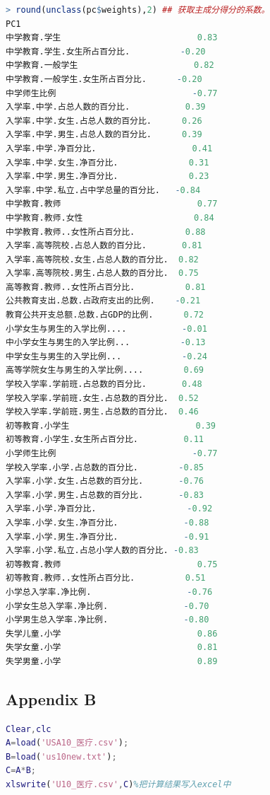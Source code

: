 \documentclass{apmcmthesis}
\begin{document}
\begin{lstlisting}[language=r]
> round(unclass(pc$weights),2) ## 获取主成分得分的系数。
PC1
中学教育.学生                           0.83
中学教育.学生.女生所占百分比.          -0.20
中学教育.一般学生                       0.82
中学教育.一般学生.女生所占百分比.      -0.20
中学师生比例                           -0.77
入学率.中学.占总人数的百分比.           0.39
入学率.中学.女生.占总人数的百分比.      0.26
入学率.中学.男生.占总人数的百分比.      0.39
入学率.中学.净百分比.                   0.41
入学率.中学.女生.净百分比.              0.31
入学率.中学.男生.净百分比.              0.23
入学率.中学.私立.占中学总量的百分比.   -0.84
中学教育.教师                           0.77
中学教育.教师.女性                      0.84
中学教育.教师..女性所占百分比.          0.88
入学率.高等院校.占总人数的百分比.       0.81
入学率.高等院校.女生.占总人数的百分比.  0.82
入学率.高等院校.男生.占总人数的百分比.  0.75
高等教育.教师..女性所占百分比.          0.81
公共教育支出.总数.占政府支出的比例.    -0.21
教育公共开支总额.总数.占GDP的比例.      0.72
小学女生与男生的入学比例....           -0.01
中小学女生与男生的入学比例...          -0.13
中学女生与男生的入学比例...            -0.24
高等学院女生与男生的入学比例....        0.69
学校入学率.学前班.占总数的百分比.       0.48
学校入学率.学前班.女生.占总数的百分比.  0.52
学校入学率.学前班.男生.占总数的百分比.  0.46
初等教育.小学生                         0.39
初等教育.小学生.女生所占百分比.         0.11
小学师生比例                           -0.77
学校入学率.小学.占总数的百分比.        -0.85
入学率.小学.女生.占总数的百分比.       -0.76
入学率.小学.男生.占总数的百分比.       -0.83
入学率.小学.净百分比.                  -0.92
入学率.小学.女生.净百分比.             -0.88
入学率.小学.男生.净百分比.             -0.91
入学率.小学.私立.占总小学人数的百分比. -0.83
初等教育.教师                           0.75
初等教育.教师..女性所占百分比.          0.51
小学总入学率.净比例.                   -0.76
小学女生总入学率.净比例.               -0.70
小学男生总入学率.净比例.               -0.80
失学儿童.小学                           0.86
失学女童.小学                           0.81
失学男童.小学                           0.89

 \end{lstlisting}
\subsection{Appendix B}
\begin{lstlisting}[language=matlab]
Clear,clc
A=load('USA10_医疗.csv');
B=load('us10new.txt');
C=A*B;
xlswrite('U10_医疗.csv',C)%把计算结果写入excel中
\end{lstlisting}
\end{document}
